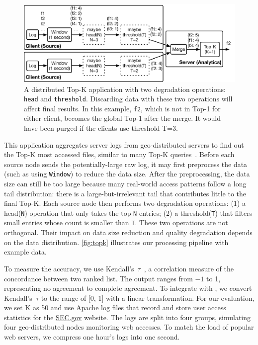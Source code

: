 \begin{figure}
  \centering
  \includegraphics[width=\columnwidth]{figures/topk.pdf}
  \caption{A distributed Top-K application with two degradation operations:
    \texttt{head} and \texttt{threshold}. Discarding data with these two
    operations will affect final results. In this example, \texttt{f2}, which is
    not in Top-1 for either client, becomes the global Top-1 after the merge. It
    would have been purged if the clients use threshold T=3.}
  \label{fig:topk}
\end{figure}

 This application aggregates server logs from
geo-distributed servers to find out the Top-K most accessed files, similar to
many Top-K queries~\cite{babcock2003distributed}. Before each source node sends
the potentially-large raw log, it may first preprocess the data (such as using
\texttt{Window}) to reduce the data size. After the preprocessing, the data size
can still be too large because many real-world access patterns follow a long
tail distribution: there is a large-but-irrelevant tail that contributes little
to the final Top-K. Each source node then performs two degradation operations:
(1) a head(\texttt{N}) operation that only takes the top \texttt{N} entries; (2)
a threshold(\texttt{T}) that filters small entries whose count is smaller than
\texttt{T}. These two operations are not orthogonal. Their impact on data size
reduction and quality degradation depends on the data
distribution. \autoref{fig:topk} illustrates our processing pipeline with
example data.

To measure the accuracy, we use Kendall's~$\tau$~\cite{abdi2007kendall}, a
correlation measure of the concordance between two ranked list. The output
ranges from \(-1\) to 1, representing no agreement to complete agreement. To
integrate with \sysname{}, we convert Kendall's~$\tau$ to the range of [0, 1]
with a linear transformation. For our evaluation, we set K as 50 and use Apache
log files that record and store user access statistics for the
\href{https://www.sec.gov}{SEC.gov} website. The logs are split into four
groups, simulating four geo-distributed nodes monitoring web accesses. To match
the load of popular web servers, we compress one hour's logs into one second.

